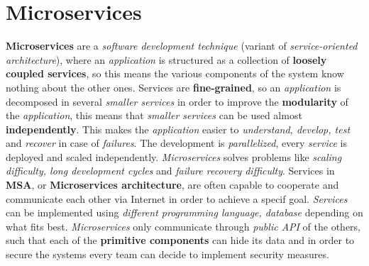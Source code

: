 \documentclass{article}
\begin{document}
\section{Microservices}
\textbf{Microservices} are a \emph{software development technique} (variant of \emph{service-oriented architecture}), where an \emph{application} is structured as a collection of \textbf{loosely coupled services}, so this means the various components of the system know nothing about the other ones. Services are \textbf{fine-grained}, so an \emph{application} is decomposed in several \emph{smaller services} in order to improve the \textbf{modularity} of the \emph{application}, this means that \emph{smaller services} can be used almost \textbf{independently}. This makes the \emph{application} easier to \emph{understand, develop, test} and \emph{recover} in case of \emph{failures}. The development is \emph{parallelized}, every \emph{service} is deployed and scaled independently. \emph{Microservices} solves problems like \emph{scaling difficulty, long development cycles} and \emph{failure recovery difficulty}. Services in \textbf{MSA}, or \textbf{Microservices architecture}, are often capable to cooperate and communicate each other via Internet in order to achieve a specif goal. \emph{Services} can be implemented using \emph{different programming language, database} depending on what fits best. \emph{Microservices} only communicate through \emph{public API} of the others, such that each of the \textbf{primitive components} can hide its data and in order to secure the systems every team can decide to implement security measures. 
\clearpage
\end{document}
